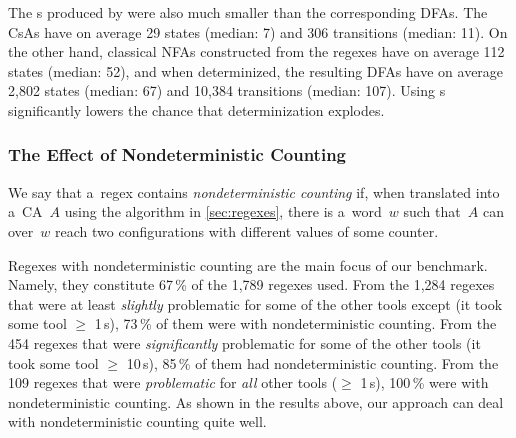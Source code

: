 \documentclass[acmsmall,screen]{acmart}
\begin{document}
The {\CSA}s produced by \catool were also much smaller than the corresponding DFAs.
%
The CsAs have on average 29 states (median: 7) and 306
transitions (median: 11).
%
On the other hand, classical NFAs constructed from the regexes have on average 112 states (median: 52),
%
and when determinized, the resulting DFAs have on average 2,802 states
(median: 67) and 10,384 transitions (median: 107).
%
Using {\CSA}s significantly lowers the chance that determinization
explodes.

\subsubsection{The Effect of Nondeterministic Counting}\label{sec:label}
\vspace{-0.0mm}
We say that a~regex contains \emph{nondeterministic counting} if, when
translated into a~CA~$A$ using the algorithm in \cref{sec:regexes}, there is
a~word~$w$ such that~$A$ can over~$w$ reach two configurations with different
values of some counter.

Regexes with nondeterministic counting are the main focus of our benchmark.
Namely, they constitute 67\,\% of the 1,789 regexes used.
From the 1,284 regexes that were at least \emph{slightly} problematic for some of
the other tools except \catool (it took some tool $\geq$ 1\,s),
73\,\% of them were with nondeterministic counting.
From the 454 regexes that were \emph{significantly} problematic for some of the other
tools (it took some tool $\geq$ 10\,s), 85\,\% of them had
nondeterministic counting.
From the 109 regexes that were \emph{problematic} for \emph{all} other tools ($\geq$
1\,s), 100\,\% were with nondeterministic counting.
As shown in the results above, our approach can deal with
nondeterministic counting quite well.


\end{document}
